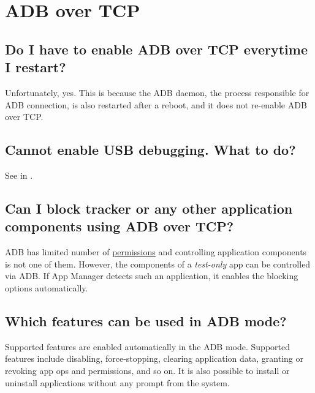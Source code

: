 \section{ADB over TCP}\label{sec:faq:adb-over-tcp} %

\subsection{Do I have to enable ADB over TCP everytime I restart?}\label{subsec:faq:enable-adb-on-every-restart} %
Unfortunately, yes. This is because the ADB daemon, the process responsible for ADB connection, is also restarted after
a reboot, and it does not re-enable ADB over TCP\@.

\subsection{Cannot enable USB debugging. What to do?}\label{subsec:faq:usb-debugging} %
See  in .

\subsection{Can I block tracker or any other application components using ADB over TCP?}\label{subsec:faq:block-components-using-adb} %
ADB has limited number of \href{https://github.com/aosp-mirror/platform_frameworks_base/blob/master/packages/Shell/AndroidManifest.xml}{permissions}
and controlling application components is not one of them. However, the components of a \textit{test-only} app can be
controlled via ADB\@. If App Manager detects such an application, it enables the blocking options automatically.

\subsection{Which features can be used in ADB mode?}\label{subsec:faq:adb-features} %
Supported features are enabled automatically in the ADB mode. Supported features include disabling, force-stopping,
clearing application data, granting or revoking app ops and permissions, and so on. It is also possible to install or
uninstall applications without any prompt from the system.
